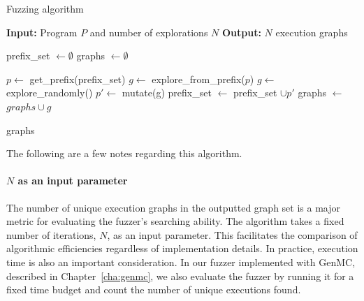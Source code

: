 
\begin{algorithm}
    \caption{Fuzzing algorithm}
    \label{fuzzer}
    \begin{algorithmic}[1]
    \STATE \textbf{Input:} Program $P$ and number of explorations $N$ \label{line:input}
    \STATE \textbf{Output:} $N$ execution graphs
    
    \STATE prefix\_set $\leftarrow \emptyset$ \label{line:init_prefix}
    \STATE graphs $\leftarrow \emptyset$ 
    
            \STATE $p \leftarrow$ get\_prefix(prefix\_set) \label{line:pick_prefix}
            \STATE $g \leftarrow $ explore\_from\_prefix($p$) \label{line:explore_prefix}
        \ELSE 
            \STATE $g \leftarrow $ explore\_randomly() \label{line:random_explore}
        \ENDIF 
         \label{line:is_interesting}
            \STATE $p' \leftarrow$ mutate(g) \label{line:mutate}
            \STATE prefix\_set $\leftarrow$ prefix\_set $\cup p'$      \label{line:add_prefix}  
        \ENDIF
        \STATE graphs $\leftarrow$ $graphs \cup g$      \label{line:add_graph}
    \ENDFOR
    
    \RETURN graphs      \label{line:output}
    \end{algorithmic}
\end{algorithm}

The following are a few notes regarding this algorithm.

\paragraph*{$N$ as an input parameter} The number of unique execution graphs in the outputted graph set is a major metric for evaluating the fuzzer's searching ability. The algorithm takes a fixed number of iterations, $N$, as an input parameter. This facilitates the comparison of algorithmic efficiencies regardless of implementation details. In practice, execution time is also an important consideration. In our fuzzer implemented with GenMC, described in Chapter~\ref{cha:genmc}, we also evaluate the fuzzer by running it for a fixed time budget and count the number of unique executions found.

